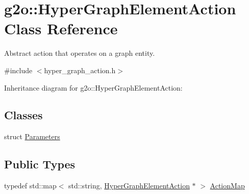 \hypertarget{classg2o_1_1HyperGraphElementAction}{}\section{g2o\+:\+:Hyper\+Graph\+Element\+Action Class Reference}
\label{classg2o_1_1HyperGraphElementAction}


Abstract action that operates on a graph entity.  




{\ttfamily \#include $<$hyper\+\_\+graph\+\_\+action.\+h$>$}



Inheritance diagram for g2o\+:\+:Hyper\+Graph\+Element\+Action\+:
\subsection*{Classes}
\begin{DoxyCompactItemize}
\item 
struct \hyperlink{structg2o_1_1HyperGraphElementAction_1_1Parameters}{Parameters}
\end{DoxyCompactItemize}
\subsection*{Public Types}
\begin{DoxyCompactItemize}
\item 
typedef std\+::map$<$ std\+::string, \hyperlink{classg2o_1_1HyperGraphElementAction}{Hyper\+Graph\+Element\+Action} $\ast$ $>$ \hyperlink{classg2o_1_1HyperGraphElementAction_abc889fc90ae1bbb63d90c7993777417a}{Action\+Map}
\end{DoxyCompactItemize}
